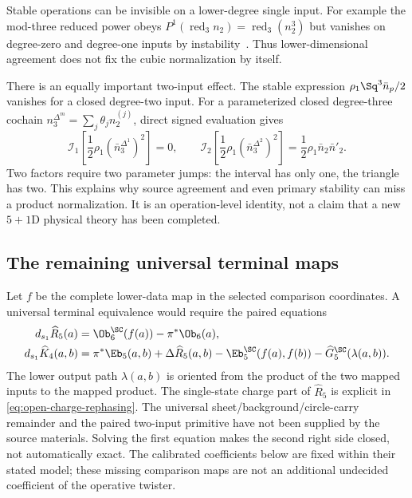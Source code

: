 Stable operations can be invisible on a lower-degree single input. For example the mod-three reduced power obeys $P^1(\operatorname{red}_3 n_2)=\operatorname{red}_3(n_2^3)$ but vanishes on degree-zero and degree-one inputs by instability~\cite{SteenrodEpstein}. Thus lower-dimensional agreement does not fix the cubic normalization by itself.

There is an equally important two-input effect. The stable expression
$\rho_1\Sq^3\bar n_p/2$ vanishes for a closed degree-two input. For a parameterized closed degree-three cochain
$n_3^{\Delta^m}=\sum_j\theta_jn_2^{(j)}$, direct signed evaluation gives
\begin{equation}\label{eq:source-invisible-transgression}
 \mathcal I_1\left[\frac12\rho_1(\bar n_3^{\Delta^1})^2\right]=0,
 \qquad
 \mathcal I_2\left[\frac12\rho_1(\bar n_3^{\Delta^2})^2\right]
 =\frac12\rho_1\bar n_2\bar n'_2.
\end{equation}
Two factors require two parameter jumps: the interval has only one, the triangle has two. This explains why source agreement and even primary stability can miss a product normalization. It is an operation-level identity, not a claim that a new $5+1$D physical theory has been completed.

\subsection{The remaining universal terminal maps}\label{subsec:remainingmap}
Let $f$ be the complete lower-data map in the selected comparison coordinates. A universal terminal equivalence would require the paired equations
\begin{align}
 d_{s_1}\widehat R_5(a)
 &=\Ob_6^{\SC}(f(a))-\pi^*\Ob_6(a),\label{eq:remaining-R5}\\
 d_{s_1}\widehat K_4(a,b)
 &=\pi^*\Eb_5(a,b)+\Delta\widehat R_5(a,b)
   -\Eb_5^{\SC}(f(a),f(b))-\widehat G_5^{\SC}(\lambda(a,b)).
 \label{eq:remaining-K4}
\end{align}
The lower output path $\lambda(a,b)$ is oriented from the product of the two mapped inputs to the mapped product. The single-state charge part of $\widehat R_5$ is explicit in \eqref{eq:open-charge-rephasing}. The universal sheet/background/circle-carry remainder and the paired two-input primitive have not been supplied by the source materials. Solving the first equation makes the second right side closed, not automatically exact. The calibrated coefficients below are fixed within their stated model; these missing comparison maps are not an additional undecided coefficient of the operative twister.
